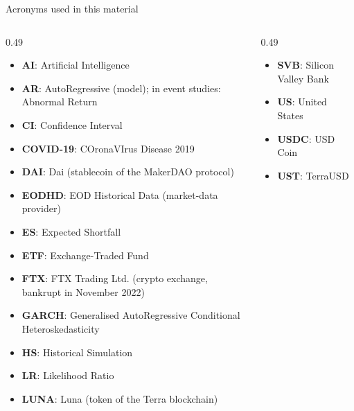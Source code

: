 
{
\begin{frame}[noframenumbering]
    \titlepage
\end{frame}
}
\begin{frame}{Acronyms used in this material}
\begin{columns}[T]
\begin{column}{0.49\textwidth}
\begin{itemize}\setlength{\itemsep}{0pt}
    \item \textbf{AI}: Artificial Intelligence
    \item \textbf{AR}: AutoRegressive (model); in event studies: Abnormal Return
    \item \textbf{CI}: Confidence Interval
    \item \textbf{COVID-19}: COronaVIrus Disease 2019
    \item \textbf{DAI}: Dai (stablecoin of the MakerDAO protocol)
    \item \textbf{EODHD}: EOD Historical Data (market-data provider)
    \item \textbf{ES}: Expected Shortfall
    \item \textbf{ETF}: Exchange-Traded Fund
    \item \textbf{FTX}: FTX Trading Ltd. (crypto exchange, bankrupt in November 2022)
    \item \textbf{GARCH}: Generalised AutoRegressive Conditional Heteroskedasticity
    \item \textbf{HS}: Historical Simulation
    \item \textbf{LR}: Likelihood Ratio
    \item \textbf{LUNA}: Luna (token of the Terra blockchain)
\end{itemize}
\end{column}
\begin{column}{0.49\textwidth}
\begin{itemize}\setlength{\itemsep}{0pt}
    \item \textbf{SVB}: Silicon Valley Bank
    \item \textbf{US}: United States
    \item \textbf{USDC}: USD Coin
    \item \textbf{UST}: TerraUSD
\end{itemize}
\end{column}
\end{columns}
\end{frame}

